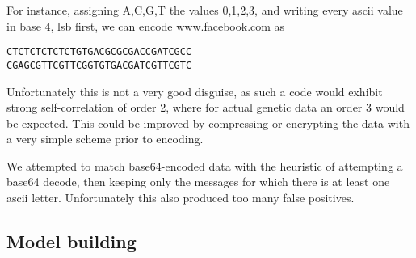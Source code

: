 \documentclass[a4paper,11pt]{article}
\begin{document}
For instance, assigning A,C,G,T the values 0,1,2,3, and writing every ascii value in base 4, lsb first, we can encode www.facebook.com as
\begin{verbatim}
CTCTCTCTCTCTGTGACGCGCGACCGATCGCC
CGAGCGTTCGTTCGGTGTGACGATCGTTCGTC
\end{verbatim}

Unfortunately this is not a very good disguise, as such a code
would exhibit strong self-correlation of order 2, where for actual genetic data an order 3 would be expected. This could be improved
by compressing or encrypting the data with a very simple scheme prior to encoding.


We attempted to match base64-encoded data with the heuristic of attempting a base64 decode, then keeping only the messages for which there is at least one ascii letter. Unfortunately this also produced too many false positives.



\subsection{Model building}
\end{document}
